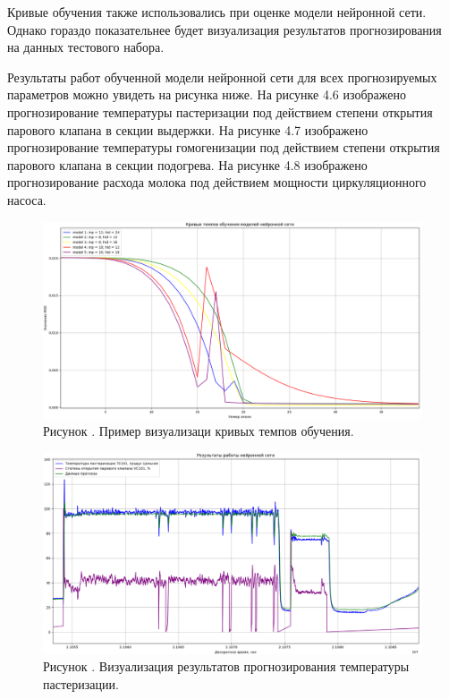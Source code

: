 {  \par \redline Кривые обучения также использовались при оценке модели нейронной сети. Однако гораздо показательнее будет визуализация результатов прогнозирования на данных тестового набора.

  \par \redline Результаты работ обученной модели нейронной сети для всех прогнозируемых параметров можно увидеть на рисунка ниже. На рисунке 4.6 изображено прогнозирование температуры пастеризации под действием степени открытия парового клапана в секции выдержки. На рисунке 4.7 изображено прогнозирование температуры гомогенизации под действием степени открытия парового клапана в секции подогрева. На рисунке 4.8 изображено прогнозирование расхода молока под действием мощности циркуляционного насоса.  

  \begin{figure}
    \centering
    \def\svgwidth{\textwidth}
    \includegraphics[width=\textheight]{images/CTL.png}
    \caption*{\gostFont Рисунок \thechaptercntr .\theimagecntr \spc {--} Пример визуализаци кривых темпов обучения.}
    \label{fig:CTL}
  \end{figure} \addtocounter{imagecntr}{1}

  \begin{figure}
    \centering
    \def\svgwidth{\textwidth}
    \includegraphics[width=\textheight]{images/TE101test.png}
    \caption*{\gostFont Рисунок \thechaptercntr .\theimagecntr \spc {--} Визуализация результатов прогнозирования температуры пастеризации.}
    \label{fig:TE101VisualPredict}
  \end{figure} \addtocounter{imagecntr}{1}

}
